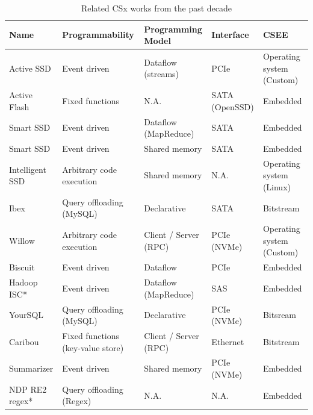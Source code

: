 \begin{table}
    \caption{Related CSx works from the past decade}
    \centering
    \begin{adjustbox}{width=1\textwidth}
        \begin{threeparttable}[]
            \begin{tabular}{lllll}
                \toprule
                \textbf{Name} & \textbf{Programmability} & \textbf{Programming Model} & \textbf{Interface} & \textbf{CSEE} \\
                \midrule
                Active SSD \cite{6062973} & Event driven & Dataflow (streams) & PCIe & Operating system (Custom) \\
                Active Flash \cite{active-flash-piller, 2013-fast-active-flash} & Fixed functions & N.A. & SATA (OpenSSD) & Embedded \\
                Smart SSD \cite{6558444} & Event driven & Dataflow (MapReduce) & SATA & Embedded \\
                Smart SSD \cite{10.1145/2463676.2465295} & Event driven & Shared memory & SATA & Embedded \\
                Intelligent SSD \cite{10.1145/2464996.2465003, 10.1145/2505515.2507847} & Arbitrary code execution\footnotemark[5] & Shared memory\footnotemark[5] & N.A. & Operating system (Linux)\footnotemark[5] \\
                Ibex \cite{10.14778/2732967.2732972} & Query offloading (MySQL) & Declarative & SATA & Bitstream \\
                Willow \cite{186149} & Arbitrary code execution & Client / Server (RPC) & PCIe (NVMe) & Operating system (Custom) \\
                Biscuit \cite{2016-isca-biscuit} & Event driven & Dataflow & PCIe & Embedded \\
                Hadoop ISC* \cite{7524716} & Event driven & Dataflow (MapReduce) & SAS & Embedded \\
                YourSQL \cite{10.14778/2994509.2994512} & Query offloading (MySQL) & Declarative & PCIe (NVMe) & Bitsream\footnotemark[6] \\
                Caribou \cite{10.14778/3137628.3137632} & Fixed functions (key-value store) & Client / Server (RPC) & Ethernet & Bitstream \\
                Summarizer \cite{10.1145/3123939.3124553} & Event driven & Shared memory & PCIe (NVMe) & Embedded \\
                NDP RE2 regex* \cite{10.1145/3211922.3211926} & Query offloading (Regex) & N.A. & N.A. & Embedded \\

\end{tabular}
\end{threeparttable}
\end{adjustbox}
\end{table}
